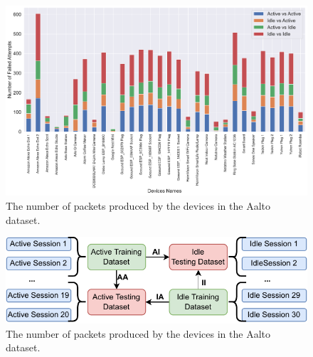 \documentclass[journal]{IEEEtran}
\begin{document}
\begin{figure}[ht]
	\centerline{\includegraphics[width=1.7\columnwidth]{images/bar.pdf}}
	\caption{The number of packets produced by the devices in the Aalto dataset.}
	\label{fig:bar}
\end{figure}

\begin{figure}[ht]
	\centerline{\includegraphics[width=1\columnwidth]{images/data.pdf}}
	\caption{The number of packets produced by the devices in the Aalto dataset.}
	\label{fig:bar}
\end{figure}
\end{document}
